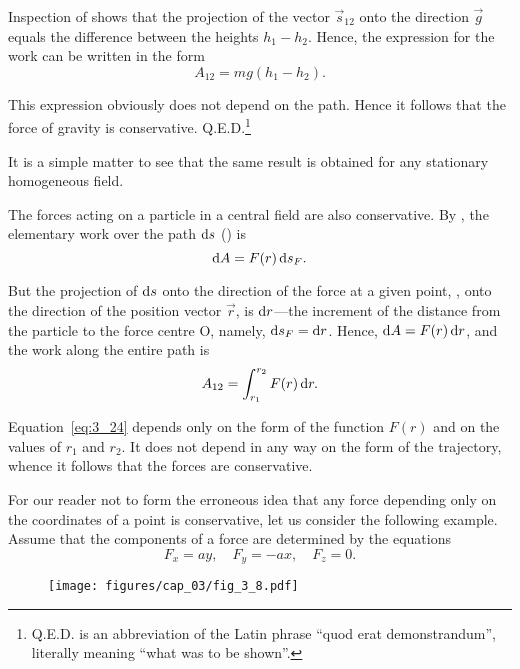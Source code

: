 \noindent
Inspection of  shows that the projection of the vector $\vec{s}_{12}$ onto the direction $\vec{g}$ equals the difference between the heights $h_1-h_2$. Hence, the expression for the work can be written in the form
\begin{equation}\label{eq:3_23}
A_{12} = mg(h_1-h_2).
\end{equation}

\noindent
This expression obviously does not depend on the path. Hence it follows that the force of gravity is conservative. Q.E.D.\footnote{Q.E.D. is an abbreviation of the Latin phrase ``quod erat demonstrandum'', literally meaning ``what was to be shown''.}

It is a simple matter to see that the same result is obtained for any stationary homogeneous field.

The forces acting on a particle in a central field are also conservative. By , the elementary work over the path $\mathrm{d} s$ () is
\begin{equation*}
\mathrm{d} A = F(r)\,\mathrm{d} s_F.
\end{equation*}

\noindent
But the projection of $\mathrm{d} s$ onto the direction of the force at a given point, \ie, onto the direction of the position vector $\vec{r}$, is $\mathrm{d} r$---the increment of the distance from the particle to the force centre O, namely, $\mathrm{d} s_F=\mathrm{d} r$. Hence, $\mathrm{d} A=F(r)\,\mathrm{d} r$, and the work along the entire path is
\begin{equation}\label{eq:3_24}
A_{12} = \int_{r_1}^{r_2} F(r)\,\mathrm{d} r.
\end{equation}

\noindent
Equation~\eqref{eq:3_24} depends only on the form of the function $F(r)$ and on the values of $r_1$ and $r_2$. It does not depend in any way on the form of the trajectory, whence it follows that the forces are conservative.

For our reader not to form the erroneous idea that any force depending only on the coordinates of a point is conservative, let us consider the following example. Assume that the components of a force are determined by the equations
\begin{equation}\label{eq:3_25}
F_x = ay,\quad F_y = -ax,\quad F_z=0.
\end{equation}

\begin{figure}[t]
	\begin{center}
		\texttt{[image: figures/cap\_03/fig\_3\_8.pdf]}
		\caption[]{}
		\label{fig:3_8}
	\end{center}
	\vspace{-0.7cm}
\end{figure}

